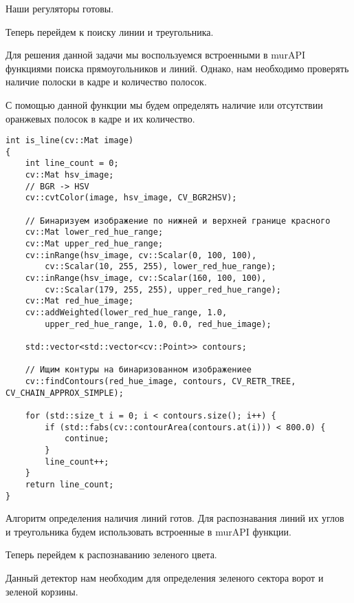 Наши регуляторы готовы. 

Теперь перейдем к поиску линии и треугольника. 

Для решения данной задачи мы воспользуемся встроенными в murAPI функциями поиска прямоугольников и линий. Однако, нам необходимо проверять наличие полоски в кадре и количество полосок. 

С помощью данной функции мы будем определять наличие или отсутствии оранжевых полосок в кадре и их количество.

\begin{verbatim}
int is_line(cv::Mat image)
{
    int line_count = 0;
    cv::Mat hsv_image;
    // BGR -> HSV
    cv::cvtColor(image, hsv_image, CV_BGR2HSV);

    // Бинаризуем изображение по нижней и верхней границе красного
    cv::Mat lower_red_hue_range;
    cv::Mat upper_red_hue_range;
    cv::inRange(hsv_image, cv::Scalar(0, 100, 100), 
        cv::Scalar(10, 255, 255), lower_red_hue_range);
    cv::inRange(hsv_image, cv::Scalar(160, 100, 100), 
        cv::Scalar(179, 255, 255), upper_red_hue_range);
    cv::Mat red_hue_image;
    cv::addWeighted(lower_red_hue_range, 1.0, 
        upper_red_hue_range, 1.0, 0.0, red_hue_image);

    std::vector<std::vector<cv::Point>> contours;

    // Ищим контуры на бинаризованном изображениее
    cv::findContours(red_hue_image, contours, CV_RETR_TREE, CV_CHAIN_APPROX_SIMPLE);

    for (std::size_t i = 0; i < contours.size(); i++) {
        if (std::fabs(cv::contourArea(contours.at(i))) < 800.0) {
            continue;
        }
        line_count++;
    }
    return line_count;
}
\end{verbatim}

Алгоритм определения наличия линий готов. Для распознавания линий их углов и треугольника будем использовать встроенные в murAPI функции. 

Теперь перейдем к распознаванию зеленого цвета.

Данный детектор нам необходим для определения зеленого сектора ворот и зеленой корзины. 

